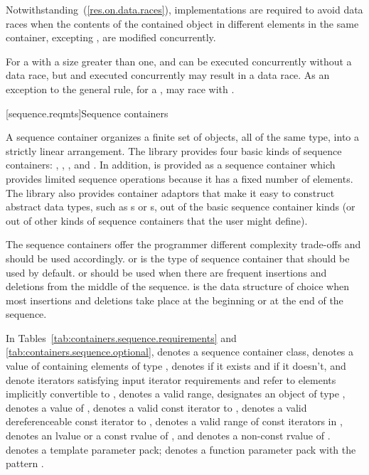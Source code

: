 \pnum
Notwithstanding~(\ref{res.on.data.races}), implementations are required to avoid data
races when the contents of the contained object in different elements in the same
container, excepting , are modified concurrently.

\pnum
\enternote For a  with a size greater than one, 
and  can be executed concurrently without a data race, but
 and  executed concurrently may result in a data
race.
As an exception to the general rule, for a , 
may race with .
\exitnote

[sequence.reqmts]{Sequence containers}

\pnum
A sequence container organizes a finite set of objects, all of the same type, into a strictly
linear arrangement. The library provides four basic kinds of sequence containers:
, , , and . In addition,
 is provided as a sequence container which provides limited sequence operations
because it has a fixed number of elements. The library also provides container adaptors that
make it easy to construct abstract data types, such as s or s, out of
the basic sequence container kinds (or out of other kinds of sequence containers that the user
might define).

\pnum
The sequence containers
offer the programmer different complexity trade-offs and should be used
accordingly.
 or 
is the type of sequence container that should be used by default.
 or 
should be used when there are frequent insertions and deletions from the
middle of the sequence.
is the data structure of choice
when most insertions and deletions take place at the beginning or at the
end of the sequence.

\pnum
In Tables~\ref{tab:containers.sequence.requirements}
and \ref{tab:containers.sequence.optional}, 
denotes a sequence container class,
 denotes a value of  containing elements of type , 
denotes  if it exists and  if it
doesn't,
 and 
denote iterators satisfying input iterator requirements
and refer to elements implicitly convertible to ,
\tcode{[i, j)}
denotes a valid range,
 designates an object of type ,
denotes a value of ,
 denotes a valid const iterator to
, 
denotes a valid dereferenceable const iterator to
, \tcode{[q1, q2)}
denotes a valid range of const iterators in
, 
denotes an lvalue or a const rvalue of
, and  denotes
a non-const rvalue of .
 denotes a template parameter pack;
 denotes a function parameter pack with the pattern .

